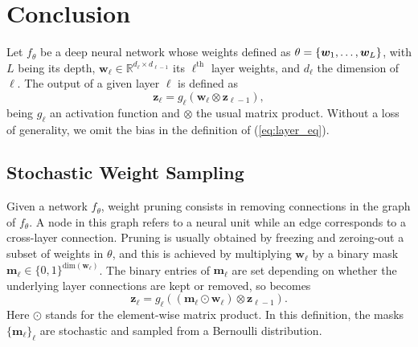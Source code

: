 \section{Conclusion}


Let $f_\theta$ be a deep neural network whose weights defined as $\theta =
\left\{\bm{w}_1,\mathellipsis, \bm{w}_L \right\}$, with $L$ being its depth,
$\bm{w}_\ell \in \mathbb{R}^{d_{\ell} \times d_{\ell-1}}$ its
$\ell^\textrm{th}$ layer weights, and $d_\ell$ the dimension of $\ell$. The
output of a given layer $\ell$ is defined as 
\begin{equation}
  \label{eq:layer_eq}
  \mathbf{z}_{\ell} = g_\ell(\bm{w}_\ell \otimes \mathbf{z}_{\ell-1}),
\end{equation}
being  $g_\ell$ an activation function and $\otimes$ the usual matrix product.
Without a loss of generality, we omit the bias in the definition of
(\ref{eq:layer_eq}).

\subsection{Stochastic Weight Sampling}
\indent Given a network $f_\theta$, weight pruning consists in removing
connections in the graph of $f_\theta$. A node in this graph refers to a
neural unit while an edge corresponds  to a cross-layer connection. Pruning is
usually obtained by freezing and zeroing-out  a subset of weights in $\theta$,
and this is achieved  by multiplying $\bm{w}_\ell$ by a binary mask
$\bm{m}_\ell \in \{ 0,1 \}^{\text{dim}(\bm{w}_\ell)}$. The
binary entries of $\bm{m}_\ell$ are set depending on whether the underlying
layer connections are kept or removed, so  becomes
\begin{equation}
  \label{eq:pruned_layer_eq}
  \mathbf{z}_{\ell} = g_\ell( (\bm{m}_\ell \odot \bm{w}_\ell ) \otimes \mathbf{z}_{\ell-1} ).
\end{equation}
Here $\odot$ stands for the element-wise matrix product. In this definition,
the masks $\{\bm{m}_\ell\}_\ell$ are stochastic and sampled from a Bernoulli
distribution.\\

